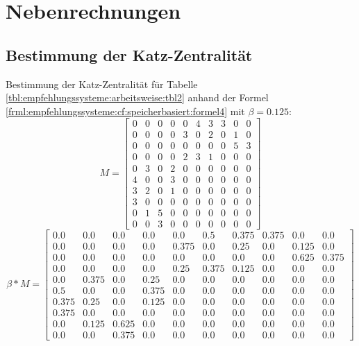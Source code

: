 \chapter{Nebenrechnungen}
\label{ch:nebenrechnungen}
\section{Bestimmung der Katz-Zentralität}
\label{ch:nebenrechnungen:katzZentralitaet}
Bestimmung der Katz-Zentralität für Tabelle \ref{tbl:empfehlungssysteme:arbeitsweise:tbl2} anhand der Formel \ref{frml:empfehlungssysteme:cf:speicherbasiert:formel4} mit $\beta = 0.125$:
\begin{equation}
	M = \begin{bmatrix}
		0 & 0 & 0 & 0 & 0 & 4 & 3 & 3 & 0 & 0\\
		0 & 0 & 0 & 0 & 3 & 0 & 2 & 0 & 1 & 0\\
		0 & 0 & 0 & 0 & 0 & 0 & 0 & 0 & 5 & 3\\
		0 & 0 & 0 & 0 & 2 & 3 & 1 & 0 & 0 & 0\\
		0 & 3 & 0 & 2 & 0 & 0 & 0 & 0 & 0 & 0\\
		4 & 0 & 0 & 3 & 0 & 0 & 0 & 0 & 0 & 0\\
		3 & 2 & 0 & 1 & 0 & 0 & 0 & 0 & 0 & 0\\
		3 & 0 & 0 & 0 & 0 & 0 & 0 & 0 & 0 & 0\\
		0 & 1 & 5 & 0 & 0 & 0 & 0 & 0 & 0 & 0\\
		0 & 0 & 3 & 0 & 0 & 0 & 0 & 0 & 0 & 0
	\end{bmatrix}
	\label{frml:berechnungDerKatzZentralitaet:formel1}
\end{equation}
\begin{equation}
	\beta * M = \begin{bmatrix}
		0.0 & 0.0 & 0.0 & 0.0 & 0.0 & 0.5 & 0.375 & 0.375 & 0.0 & 0.0\\
		0.0 & 0.0 & 0.0 & 0.0 & 0.375 & 0.0 & 0.25 & 0.0 & 0.125 & 0.0\\
		0.0 & 0.0 & 0.0 & 0.0 & 0.0 & 0.0 & 0.0 & 0.0 & 0.625 & 0.375\\
		0.0 & 0.0 & 0.0 & 0.0 & 0.25 & 0.375 & 0.125 & 0.0 & 0.0 & 0.0\\
		0.0 & 0.375 & 0.0 & 0.25 & 0.0 & 0.0 & 0.0 & 0.0 & 0.0 & 0.0\\
		0.5 & 0.0 & 0.0 & 0.375 & 0.0 & 0.0 & 0.0 & 0.0 & 0.0 & 0.0\\
		0.375 & 0.25 & 0.0 & 0.125 & 0.0 & 0.0 & 0.0 & 0.0 & 0.0 & 0.0\\
		0.375 & 0.0 & 0.0 & 0.0 & 0.0 & 0.0 & 0.0 & 0.0 & 0.0 & 0.0\\
		0.0 & 0.125 & 0.625 & 0.0 & 0.0 & 0.0 & 0.0 & 0.0 & 0.0 & 0.0\\
		0.0 & 0.0 & 0.375 & 0.0 & 0.0 & 0.0 & 0.0 & 0.0 & 0.0 & 0.0
	\end{bmatrix}
	\label{frml:berechnungDerKatzZentralitaet:formel2}
\end{equation}
